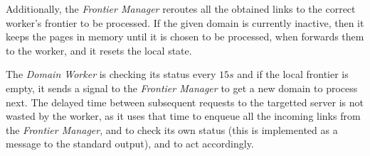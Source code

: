 \documentclass{article}
\begin{document}
Additionally, the \textit{Frontier Manager} reroutes all the obtained links to the correct worker's frontier to be processed. If the given domain is currently inactive, then it keeps the pages in memory until it is chosen to be processed, when forwards them to the worker, and it resets the local state.

The \textit{Domain Worker} is checking its status every $15s$ and if the local frontier is empty, it sends a signal to the \textit{Frontier Manager} to get a new domain to process next. The delayed time between subsequent requests to the targetted server is not wasted by the worker, as it uses that time to enqueue all the incoming links from the \textit{Frontier Manager}, and to check its own status (this is implemented as a message to the standard output), and to act accordingly.
\end{document}
